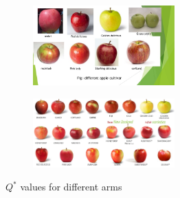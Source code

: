\documentclass{article}
\begin{document}
\begin{figure}[htb]
    \centering
    \begin{subfigure}[b]{\textwidth}
        \includegraphics[width=0.6\textwidth]{images/apple_varieties.jpg}
        \label{fig:arm1}
    \end{subfigure}
%
    \begin{subfigure}[b]{\textwidth}
        \includegraphics[width=0.6\textwidth]{images/apple_varieties2.jpg}
        \label{fig:arm2}
    \end{subfigure}
    \caption{$Q^{*}$ values for different arms}
\end{figure}
\end{document}
